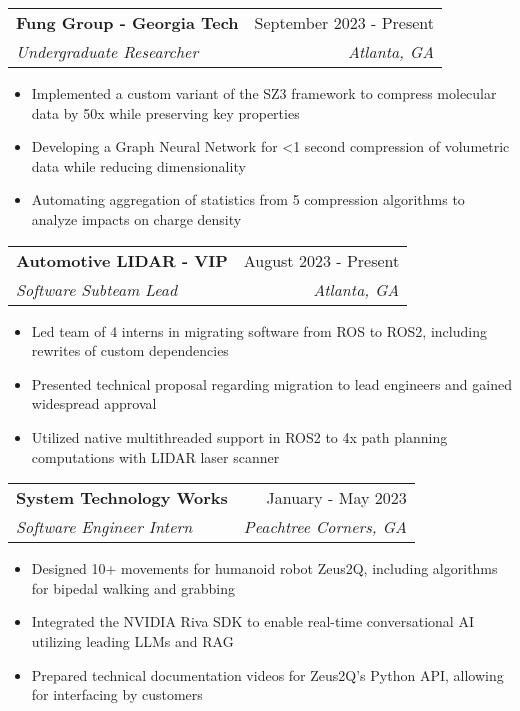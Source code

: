 \documentclass[letterpaper,11pt]{article}
\makeatletter
\newcommand{\resumeItem}[1]{
  \item\small{
    {#1 \vspace{-2pt}}
  }
}
\newcommand{\resumeSubheading}[4]{%
\vspace{-1pt}%
  \item
    \begin{tabular*}{0.97\textwidth}{l@{\extracolsep{\fill}}r}
      \textbf{#1} & #2 \\
      \textit{\small#3} & \textit{\small #4} \\

    \end{tabular*}%
  \vspace{-9pt}
}
\newcommand{\resumeItemListStart}{\begin{itemize}}
\newcommand{\resumeItemListEnd}{\end{itemize}\vspace{-5pt}}
\makeatother
\begin{document}
			\resumeSubheading
			{Fung Group - Georgia Tech}{September 2023 - Present}
			{Undergraduate Researcher}{Atlanta, GA}
			\resumeItemListStart
				\resumeItem{Implemented a custom variant of the SZ3 framework to compress molecular data by 50x while preserving key properties}
				\resumeItem{Developing a Graph Neural Network for \textless 1 second compression of volumetric data while reducing dimensionality}
				\resumeItem{Automating aggregation of statistics from 5 compression algorithms to analyze impacts on charge density}
			\resumeItemListEnd

			\resumeSubheading
			{Automotive LIDAR - VIP}{August 2023 - Present}
			{Software Subteam Lead}{Atlanta, GA}
			\resumeItemListStart
				\resumeItem{Led team of 4 interns in migrating software from ROS to ROS2, including rewrites of custom dependencies}
				\resumeItem{Presented technical proposal regarding migration to lead engineers and gained widespread approval}
				\resumeItem{Utilized native multithreaded support in ROS2 to 4x path planning computations with LIDAR laser scanner}
			\resumeItemListEnd

			\resumeSubheading
			{System Technology Works}{January - May 2023}
			{Software Engineer Intern}{Peachtree Corners, GA}
			\resumeItemListStart
				\resumeItem{Designed 10+ movements for humanoid robot Zeus2Q, including algorithms for bipedal walking and grabbing}
				\resumeItem{Integrated the NVIDIA Riva SDK to enable real-time conversational AI utilizing leading LLMs and RAG}
				\resumeItem{Prepared technical documentation videos for Zeus2Q's Python API, allowing for interfacing by customers}
			\resumeItemListEnd

			\begin{comment}
			\resumeSubheading
			{Meta \& Major League Hacking}{June 2024 - Present}
			{Production Engineer Intern}{}
			\resumeItemListStart
				\resumeItem{Developing real-world projects utilizing relevant SRE skills with mentorship from Meta engineers}
				\resumeItem{Enrolled in a 12-week hands-on curriculum covering key DevOps concepts, augmented by events led by industry experts}
				\resumeItem{Working with 10+ interns to create a thoroughly developed portfolio utilizing industry best practices and services}
			\resumeItemListEnd
			\end{comment}


\end{document}
